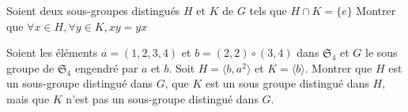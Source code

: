 \documentclass{report}
\begin{document}
\begin{exo}
    Soient deux sous-groupes distingués \(H\) et \(K\) de \(G\) tels que \(H\cap K=\{e\}\)
    Montrer que \(\forall x\in H,\forall y\in K, xy=yx\)
\end{exo}

\begin{exo}
    Soient les éléments \(a=(1,2,3,4)\) et \(b=(2,2)\circ(3,4)\) dans \(\mathfrak{S}_4\)
    et \(G\) le sous groupe de \(\mathfrak{S}_4\) engendré par \(a\) et \(b\). Soit
    \(H=\langle b,a^2\rangle\) et \(K=\langle b\rangle\). Montrer que \(H\) est un sous-groupe
    distingué dans \(G\), que \(K\) est un sous groupe distingué dans \(H\), mais que
    \(K\) n'est pas un sous-groupe distingué dans \(G\).
\end{exo}
\end{document}
